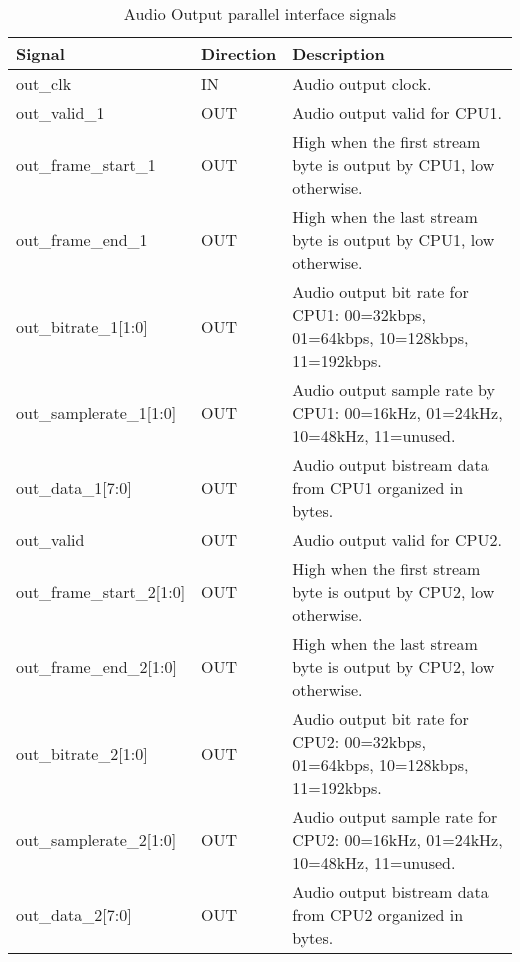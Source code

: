 \documentclass{rep}
\theoremstyle{plain}
\begin{document}
\begin{table}[H]
  \begin{center}
    \begin{tabular}{|l|l|p{8cm}|}
      \hline
      \rowcolor{iob-green}
      \textbf{Signal} & \textbf{Direction} & \textbf{Description} \\
      \hline
      \hline

      out\_clk & IN & Audio output clock.\\ \hline

      \rowcolor{iob-blue} out\_valid\_1 & OUT & Audio output valid for CPU1. \\ \hline
      
      out\_frame\_start\_1 & OUT & High when the first stream byte is output by CPU1, low
      otherwise.\\ \hline

      \rowcolor{iob-blue} out\_frame\_end\_1 & OUT & High when the last stream byte
      is output by CPU1, low otherwise.\\ \hline

      out\_bitrate\_1[1:0] & OUT & Audio output bit rate for CPU1: 00=32kbps,
      01=64kbps, 10=128kbps, 11=192kbps.\\ \hline

      \rowcolor{iob-blue}
      out\_samplerate\_1[1:0] & OUT & Audio output sample rate by CPU1: 00=16kHz,
      01=24kHz, 10=48kHz, 11=unused.\\ \hline

      out\_data\_1[7:0] & OUT & Audio output bistream data from CPU1 organized in bytes.\\
      \hline
      \hline

      \rowcolor{iob-blue} out\_valid & OUT & Audio output valid for CPU2. \\ \hline
      
      out\_frame\_start\_2[1:0] & OUT & High when the first stream byte is output by CPU2, low
      otherwise.\\ \hline

      \rowcolor{iob-blue} out\_frame\_end\_2[1:0] & OUT & High when the last stream byte
      is output by CPU2, low otherwise.\\ \hline

      out\_bitrate\_2[1:0] & OUT & Audio output bit rate for CPU2: 00=32kbps,
      01=64kbps, 10=128kbps, 11=192kbps.\\ \hline

      \rowcolor{iob-blue}
      out\_samplerate\_2[1:0] & OUT & Audio output sample rate for CPU2: 00=16kHz,
      01=24kHz, 10=48kHz, 11=unused.\\ \hline

      out\_data\_2[7:0] & OUT & Audio output bistream data  from CPU2 organized in bytes.\\
      \hline

    \end{tabular}
    \caption{Audio Output parallel interface signals}
    \label{tab:out}
  \end{center}
\end{table}
\end{document}
